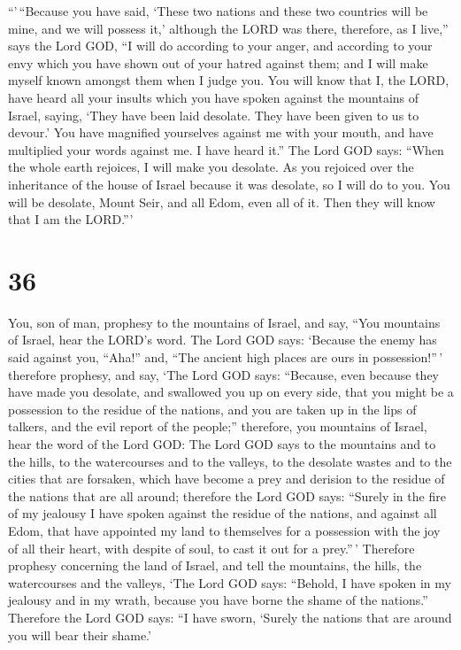  ``'\,``Because you have said, `These two nations and
these two countries will be mine, and we will possess it,' although the
LORD was there,  therefore, as I live,'' says the Lord
GOD, ``I will do according to your anger, and according to your envy
which you have shown out of your hatred against them; and I will make
myself known amongst them when I judge you.  You will
know that I, the LORD, have heard all your insults which you have spoken
against the mountains of Israel, saying, `They have been laid desolate.
They have been given to us to devour.'  You have
magnified yourselves against me with your mouth, and have multiplied
your words against me. I have heard it.''  The Lord GOD
says: ``When the whole earth rejoices, I will make you desolate.
 As you rejoiced over the inheritance of the house of
Israel because it was desolate, so I will do to you. You will be
desolate, Mount Seir, and all Edom, even all of it. Then they will know
that I am the LORD.'''

\hypertarget{section-34}{%
\section{36}\label{section-34}}

 You, son of man, prophesy to the mountains of Israel, and
say, ``You mountains of Israel, hear the LORD's word.  The
Lord GOD says: `Because the enemy has said against you, ``Aha!'' and,
``The ancient high places are ours in possession!''\,' 
therefore prophesy, and say, `The Lord GOD says: ``Because, even because
they have made you desolate, and swallowed you up on every side, that
you might be a possession to the residue of the nations, and you are
taken up in the lips of talkers, and the evil report of the people;''
 therefore, you mountains of Israel, hear the word of the
Lord GOD: The Lord GOD says to the mountains and to the hills, to the
watercourses and to the valleys, to the desolate wastes and to the
cities that are forsaken, which have become a prey and derision to the
residue of the nations that are all around;  therefore the
Lord GOD says: ``Surely in the fire of my jealousy I have spoken against
the residue of the nations, and against all Edom, that have appointed my
land to themselves for a possession with the joy of all their heart,
with despite of soul, to cast it out for a prey.''\,' 
Therefore prophesy concerning the land of Israel, and tell the
mountains, the hills, the watercourses and the valleys, `The Lord GOD
says: ``Behold, I have spoken in my jealousy and in my wrath, because
you have borne the shame of the nations.''  Therefore the
Lord GOD says: ``I have sworn, `Surely the nations that are around you
will bear their shame.'

